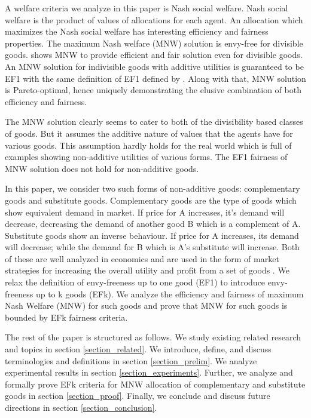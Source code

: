A welfare criteria we analyze in this paper is Nash social welfare. Nash social welfare is the product of values of allocations for each agent. An allocation which maximizes the Nash social welfare has interesting efficiency and fairness properties. The maximum Nash welfare (MNW) solution is envy-free for divisible goods. \cite{caragiannis2016unreasonable} shows MNW to provide efficient and fair solution even for divisible goods. An MNW solution for indivisible goods with additive utilities is guaranteed to be EF1 \cite{caragiannis2016unreasonable} with the same definition of EF1 defined by \cite{budish2011combinatorial}. Along with that, MNW solution is Pareto-optimal, hence uniquely demonstrating the elusive combination of both efficiency and fairness.

The MNW solution clearly seems to cater to both of the divisibility based classes of goods. But it assumes the additive nature of values that the agents have for various goods. This assumption hardly holds for the real world which is full of examples showing non-additive utilities of various forms. The EF1 fairness of MNW solution does not hold for non-additive goods. 

In this paper, we consider two such forms of non-additive goods: complementary goods and substitute goods. Complementary goods are the type of goods which show equivalent demand in market. If price for A increases, it's demand will decrease, decreasing the demand of another good B which is a complement of A. Substitute goods show an inverse behaviour. If price for A increases, its demand will decrease; while the demand for B which is A's substitute will increase. Both of these are well analyzed in economics and are used in the form of market strategies for increasing the overall utility and profit from a set of goods \cite{lewbel1985bundling, kojima1975international, bulow1985multimarket}. We relax the definition of envy-freeness up to one good (EF1) \cite{budish2011combinatorial} to introduce envy-freeness up to k goods (EFk). We analyze the efficiency and fairness of maximum Nash Welfare (MNW) for such goods and prove that MNW for such goods is bounded by EFk fairness criteria.

The rest of the paper is structured as follows. We study existing related research and topics in section \ref{section_related}. We introduce, define, and discuss terminologies and definitions in section \ref{section_prelim}. We analyze experimental results in section \ref{section_experiments}. Further, we analyze and formally prove EFk criteria for MNW allocation of complementary and substitute goods in section \ref{section_proof}. Finally, we conclude and discuss future directions in section \ref{section_conclusion}.

